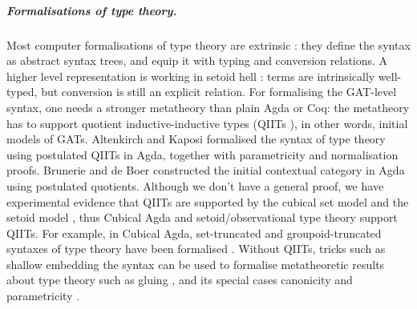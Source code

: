 \documentclass[a4paper,UKenglish,cleveref, autoref, thm-restate]{lipics-v2021}
\begin{document}
\subparagraph*{Formalisations of type theory.}
Most computer formalisations of type theory are extrinsic
\cite{DBLP:journals/pacmpl/0001OV18,DBLP:conf/cpp/AdjedjLMPP24,DBLP:journals/jar/SozeauABCFKMTW20}:
they define the syntax as abstract syntax trees, and equip it with
typing and conversion relations. A higher level representation is
working in setoid hell \cite{chapman09eatitself,setoidhell}: terms are
intrinsically well-typed, but conversion is still an explicit
relation. For formalising the GAT-level syntax, one needs a stronger
metatheory than plain Agda or Coq: the metatheory has to support
quotient inductive-inductive types (QIITs
\cite{DBLP:journals/pacmpl/KaposiKA19}), in other words, initial
models of GATs. Altenkirch and Kaposi
\cite{DBLP:conf/popl/AltenkirchK16} formalised the syntax of type
theory using postulated QIITs in Agda, together with parametricity and
normalisation \cite{lmcs:4005} proofs. Brunerie and de Boer
\cite{initiality-agda} constructed the initial contextual category in
Agda using postulated quotients. Although we don't have a general
proof, we have experimental evidence that QIITs are supported by the
cubical set model \cite{DBLP:conf/lics/CoquandHM18} and the setoid
model \cite{kaposi-qiit-setoid}, thus Cubical Agda
\cite{DBLP:journals/jfp/VezzosiMA21} and setoid/observational type
theory \cite{setoid,DBLP:phd/hal/Pujet22} support QIITs. For example,
in Cubical Agda, set-truncated and groupoid-truncated syntaxes of type
theory have been formalised \cite{cohtt}. Without QIITs, tricks such
as shallow embedding the syntax can be used to formalise metatheoretic
results about type theory such as gluing
\cite{kaposi_et_al:LIPIcs:2019:10532}, and its special cases
canonicity and parametricity \cite{kaposi-shallow}.
\end{document}
